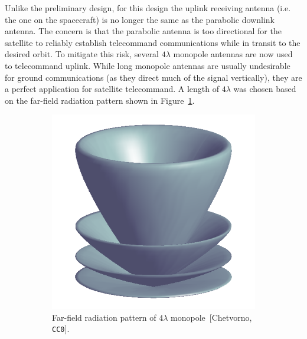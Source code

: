\documentclass[9pt]{article}
\begin{document}
Unlike the preliminary design, for this design the uplink receiving antenna (i.e. the one on the spacecraft) is no longer the same as the parabolic downlink antenna.
The concern is that the parabolic antenna is too directional for the satellite to reliably establish telecommand communications while in transit to the desired orbit.
To mitigate this risk, several $4\lambda$ monopole antennas are now used to telecommand uplink.
While long monopole antennas are usually undesirable for ground communications (as they direct much of the signal vertically), they are a perfect application for satellite telecommand.
A length of $4\lambda$ was chosen based on the far-field radiation pattern shown in Figure~\ref{fig:radpat}.

\begin{figure}[h]
  \centering
  \captionsetup{width=.75\linewidth,font=small,labelfont=bf}
  \begin{subfigure}{.25\textwidth}
    \includegraphics[width=\textwidth]{monopolepattern}
    \caption{Far-field radiation pattern of $4\lambda$ monopole~[Chetvorno, \texttt{CC0}].}
    \label{fig:radpat}
  \end{subfigure}
  \hspace{4em}
  \begin{subfigure}{.35\textwidth}

\end{subfigure}
\end{figure}
\end{document}
